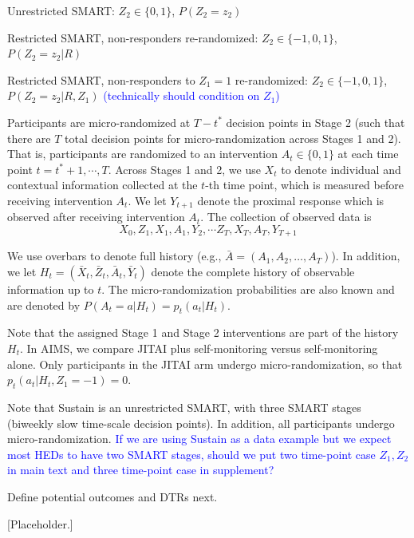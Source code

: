\documentclass[12pt]{article}
\begin{document}
\quad Unrestricted SMART: $Z_2 \in \{0,1\}$, $P(Z_2 = z_2)$

\quad Restricted SMART, non-responders re-randomized: $Z_2 \in \{-1, 0, 1\}$, $P(Z_2 = z_2 | R)$

\quad Restricted SMART, non-responders to $Z_1 = 1$ re-randomized: $Z_2 \in \{-1, 0, 1\}$, $P(Z_2 = z_2 | R, Z_1)$ \textcolor{blue}{(technically should condition on $Z_1$)}

Participants are micro-randomized at $T-t^*$ decision points in Stage 2 (such that there are $T$ total decision points for micro-randomization across Stages 1 and 2). That is, participants are randomized to an intervention $A_t \in \{0,1\}$ at each time point $t = t^* + 1, \cdots, T$. Across Stages 1 and 2, we use $X_t$ to denote individual and contextual information collected at the $t$-th time point, which is measured before receiving intervention $A_t$. We let $Y_{t+1}$ denote the proximal response which is observed after receiving intervention $A_t$. The collection of observed data is
\begin{equation*}
    X_0, Z_1, X_1, A_1, Y_2, \cdots Z_T, X_T, A_T, Y_{T+1}
\end{equation*}

We use overbars to denote full history (e.g., $\bar{A} = (A_1, A_2, \ldots, A_T)$). In addition, we let $H_t = (\bar{X}_t, \bar{Z}_t, \bar{A}_t, \bar{Y}_t)$ denote the complete history of observable information up to $t$. The micro-randomization probabilities are also known and are denoted by $P(A_t = a | H_t) = p_t(a_t | H_t)$.

Note that the assigned Stage 1 and Stage 2 interventions are part of the history $H_t$. In AIMS, we compare JITAI plus self-monitoring versus self-monitoring alone. Only participants in the JITAI arm undergo micro-randomization, so that $p_t(a_t | H_t, Z_1 = -1) = 0$.

Note that Sustain is an unrestricted SMART, with three SMART stages (biweekly slow time-scale decision points). In addition, all participants undergo micro-randomization. \textcolor{blue}{If we are using Sustain as a data example but we expect most HEDs to have two SMART stages, should we put two time-point case $Z_1, Z_2$ in main text and three time-point case in supplement?}

Define potential outcomes and DTRs next. 


\begin{assumption}
\label{ass:core}
[Placeholder.]
\end{assumption}
\end{document}
